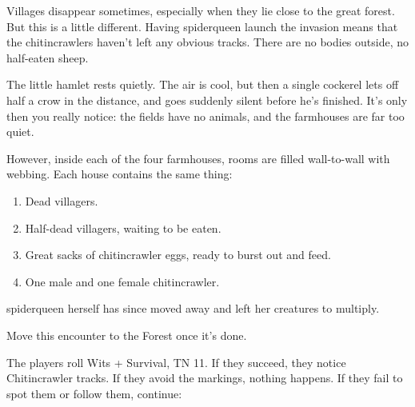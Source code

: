 \begin{multicols}{2}

\begin{figure*}[t]

	\label{ruined_village_map}\label{ruined_village_map}

\end{figure*}

Villages disappear sometimes, especially when they lie close to the great forest.  But this is a little different.  Having \gls{spiderqueen} launch the invasion means that the chitincrawlers haven't left any obvious tracks.  There are no bodies outside, no half-eaten sheep.

\begin{boxtext}

	The little hamlet rests quietly.
	The air is cool, but then a single cockerel lets off half a crow in the distance, and goes suddenly silent before he's finished.
	It's only then you really notice: the fields have no animals, and the farmhouses are far too quiet.

\end{boxtext}

However, inside each of the four farmhouses, rooms are filled wall-to-wall with webbing.  Each house contains the same thing:

\begin{enumerate}

	\item{Dead villagers.}
	\item{Half-dead villagers, waiting to be eaten.}
	\item{Great sacks of chitincrawler eggs, ready to burst out and feed.}
	\item{One male and one female chitincrawler.}
\end{enumerate}

\Gls{spiderqueen} herself has since moved away and left her creatures to multiply.

Move this encounter to the Forest once it's done.




The players roll Wits + Survival, TN 11.  If they succeed, they notice Chitincrawler tracks.  If they avoid the markings, nothing happens.  If they fail to spot them or follow them, continue:


\end{multicols}
